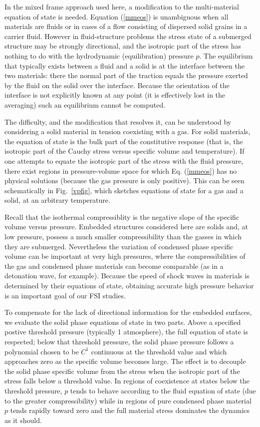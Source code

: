 In the mixed frame approach used here, a modification to the multi-material
equation of state is needed.  Equation (\ref{mmeos}) is unambiguous when all
materials are fluids or in cases of a flow consisting of dispersed solid grains
in a carrier fluid.  However in fluid-structure problems the stress state of a
submerged structure may be strongly directional, and the isotropic part of the
stress has nothing to do with the hydrodynamic (equilibration) pressure $p$.
The equilibrium that typically exists between a fluid and a solid is at the
interface between the two materials: there the normal part of the traction
equals the pressure exerted by the fluid on the solid over the interface.
Because the orientation of the interface is not explicitly known at any
point (it is effectively lost in the averaging) such an equilibrium cannot
be computed.

The difficulty, and the modification that resolves it, can be understood by
considering a solid material in tension coexisting with a gas.  For solid
materials, the equation of state is the bulk part of the constitutive response
(that is, the isotropic part of the Cauchy stress versus specific volume and
temperature).  If one attempts to equate the isotropic part of the stress
with the fluid pressure, there exist regions in pressure-volume space for
which Eq. (\ref{mmeos}) has no physical solutions (because the gas pressure
is only positive).  This can be seen schematically in Fig.~\ref{vpfig}, which
sketches equations of state for a gas and a solid, at an arbitrary temperature.

Recall that the isothermal compressiblity is the negative slope of the
specific volume versus pressure.  Embedded structures considered here are
solids and, at low pressure, possess a much smaller compressibility than
the gasses in which they are submerged.  Nevertheless the variation of
condensed phase specific volume can be important at very high pressures,
where the compressibilities of the gas and condensed phase materials can
become comparable (as in a detonation wave, for example).  Because the speed of
shock waves in materials is determined by their equations of state, obtaining
accurate high pressure behavior is an important goal of our FSI studies.

To compensate for the lack of directional information for the embedded
surfaces, we evaluate the solid phase equations of state in two parts.
Above a specified postive threshold pressure (typically 1 atmosphere),
the full equation of state is respected; below that threshold pressure, the
solid phase pressure follows a polynomial chosen to be $C^1$ continuous at the
threshold value and which approaches zero as the specific volume becomes large.
The effect is to decouple the solid phase specific volume from the stress when
the isotropic part of the stress falls below a threshold value.  In regions
of coexistence at states below the threshold pressure, $p$ tends to behave
according to the fluid equation of state (due to the greater compressibility)
while in regions of pure condensed phase material $p$ tends rapidly toward
zero and the full material stress dominates the dynamics as it should.

